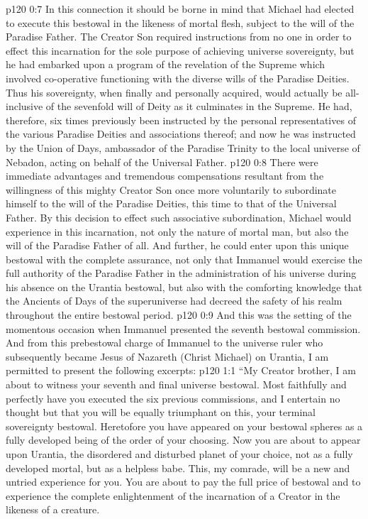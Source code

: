 \vs p120 0:7 \pc In this connection it should be borne in mind that Michael had elected to execute this bestowal in the likeness of mortal flesh, subject to the will of the Paradise Father. The Creator Son required instructions from no one in order to effect this incarnation for the sole purpose of achieving universe sovereignty, but he had embarked upon a program of the revelation of the Supreme which involved co\hyp{}operative functioning with the diverse wills of the Paradise Deities. Thus his sovereignty, when finally and personally acquired, would actually be all\hyp{}inclusive of the sevenfold will of Deity as it culminates in the Supreme. He had, therefore, six times previously been instructed by the personal representatives of the various Paradise Deities and associations thereof; and now he was instructed by the Union of Days, ambassador of the Paradise Trinity to the local universe of Nebadon, acting on behalf of the Universal Father.
\vs p120 0:8 \pc There were immediate advantages and tremendous compensations resultant from the willingness of this mighty Creator Son once more voluntarily to subordinate himself to the will of the Paradise Deities, this time to that of the Universal Father. By this decision to effect such associative subordination, Michael would experience in this incarnation, not only the nature of mortal man, but also the will of the Paradise Father of all. And further, he could enter upon this unique bestowal with the complete assurance, not only that Immanuel would exercise the full authority of the Paradise Father in the administration of his universe during his absence on the Urantia bestowal, but also with the comforting knowledge that the Ancients of Days of the superuniverse had decreed the safety of his realm throughout the entire bestowal period.
\vs p120 0:9 \pc And this was the setting of the momentous occasion when Immanuel presented the seventh bestowal commission. And from this prebestowal charge of Immanuel to the universe ruler who subsequently became Jesus of Nazareth (Christ Michael) on Urantia, I am permitted to present the following excerpts:
\vs p120 1:1 “My Creator brother, I am about to witness your seventh and final universe bestowal. Most faithfully and perfectly have you executed the six previous commissions, and I entertain no thought but that you will be equally triumphant on this, your terminal sovereignty bestowal. Heretofore you have appeared on your bestowal spheres as a fully developed being of the order of your choosing. Now you are about to appear upon Urantia, the disordered and disturbed planet of your choice, not as a fully developed mortal, but as a helpless babe. This, my comrade, will be a new and untried experience for you. You are about to pay the full price of bestowal and to experience the complete enlightenment of the incarnation of a Creator in the likeness of a creature.
